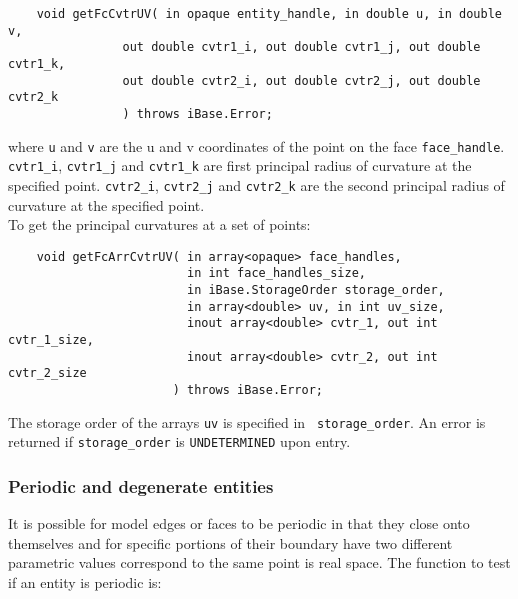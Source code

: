 \documentclass{article}
\begin{document}
\begin{verbatim}
    void getFcCvtrUV( in opaque entity_handle, in double u, in double v,
                out double cvtr1_i, out double cvtr1_j, out double cvtr1_k,
                out double cvtr2_i, out double cvtr2_j, out double cvtr2_k
                ) throws iBase.Error;
\end{verbatim}
where {\tt u} and {\tt v} are the u and v coordinates of 
the point on the face {\tt face\_handle}. {\tt cvtr1\_i}, {\tt cvtr1\_j}
and {\tt cvtr1\_k} are first 
principal radius of curvature at the specified point. {\tt cvtr2\_i},
{\tt cvtr2\_j} and
{\tt cvtr2\_k} are the second principal radius of curvature at the specified 
point.\\ %

\hspace{-16pt}To get the principal curvatures at a set of points:

\begin{verbatim}
    void getFcArrCvtrUV( in array<opaque> face_handles, 
                         in int face_handles_size,
                         in iBase.StorageOrder storage_order,
                         in array<double> uv, in int uv_size,
                         inout array<double> cvtr_1, out int cvtr_1_size,
                         inout array<double> cvtr_2, out int cvtr_2_size
                       ) throws iBase.Error;								    
\end{verbatim}
The storage order of the arrays {\tt uv} is specified in {\tt
 storage\_order}. An error is returned if {\tt storage\_order}
 is {\tt UNDETERMINED} upon entry.
 
\subsubsection{Periodic and degenerate entities}
It is possible for model edges or faces to be periodic in 
that they close onto themselves and for specific portions of 
their boundary have two different parametric values correspond 
to the same point is real space. The function to test if an entity 
is periodic is:
\end{document}

